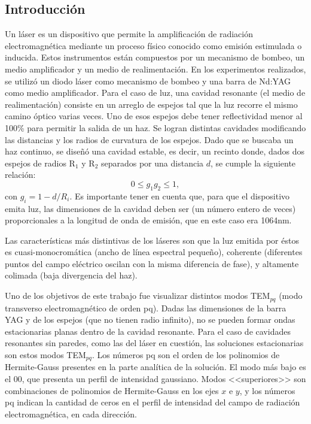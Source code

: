 \documentclass[10pt, a4paper]{article}%
\begin{document}
\begin{multicols}{2} %

\section*{Introducción}

Un láser es un dispositivo que permite la amplificación de radiación electromagnética mediante un proceso físico conocido como emisión estimulada o inducida. Estos instrumentos están compuestos por un mecanismo de bombeo, un medio amplificador y un medio de realimentación. En los experimentos realizados, se utilizó un diodo láser como mecanismo de bombeo y una barra de Nd:YAG como medio amplificador. Para el caso de luz, una cavidad resonante (el medio de realimentación) consiste en un arreglo de espejos tal que la luz recorre el mismo camino óptico varias veces. Uno de esos espejos debe tener reflectividad menor al 100\% para permitir la salida de un haz. Se logran distintas cavidades modificando las distancias y los radios de curvatura de los espejos. Dado que se buscaba un haz continuo, se diseñó una cavidad estable, es decir, un recinto donde, dados dos espejos de radios R$_1$ y R$_2$ separados por una distancia $d$, se cumple la siguiente relación:
\begin{equation}
    0 \leq g_1 g_2 \leq 1,
\end{equation}
con $g_i = 1 - d/R_i$. Es importante tener en cuenta que, para que el dispositivo emita luz, las dimensiones de la cavidad deben ser (un número entero de veces) proporcionales a la longitud de onda de emisión, que en este caso era 1064nm.

Las características más distintivas de los láseres son que la luz emitida por éstos es cuasi-monocromática (ancho de línea espectral pequeño), coherente (diferentes puntos del campo eléctrico oscilan con la misma diferencia de fase), y altamente colimada (baja divergencia del haz).


Uno de los objetivos de este trabajo fue visualizar distintos modos TEM$_{pq}$ (modo transverso electromagnético de orden pq). Dadas las dimensiones de la barra YAG y de los espejos (que no tienen radio infinito), no se pueden formar ondas estacionarias planas dentro de la cavidad resonante. Para el caso de cavidades resonantes sin paredes, como las del láser en cuestión, las soluciones estacionarias son estos modos TEM$_{pq}$. Los números pq son el orden de los polinomios de Hermite-Gauss presentes en la parte analítica de la solución.
El modo más bajo es el 00, que presenta un perfil de intensidad gaussiano. Modos <<superiores>> son combinaciones de polinomios de Hermite-Gauss en los ejes $x$ e $y$, y los números pq indican la cantidad de ceros en el perfil de intensidad del campo de radiación electromagnética, en cada dirección\cite{1}.


\end{multicols}
\end{document}
